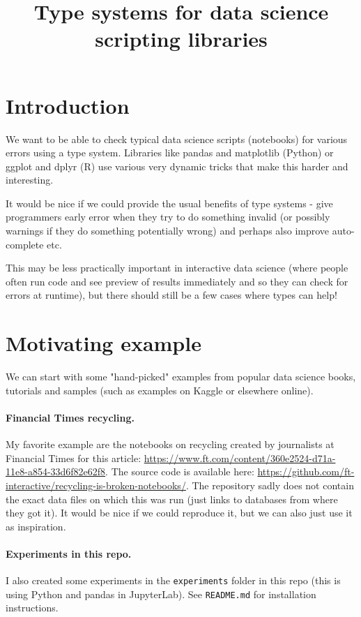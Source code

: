 \documentclass{article}
\begin{document}
\title{Type systems for data science scripting libraries}
\maketitle

\section{Introduction}
We want to be able to check typical data science scripts (notebooks) for various errors using a type system. Libraries like pandas and matplotlib (Python) or ggplot and dplyr (R) use various very dynamic tricks that make this harder and interesting.

It would be nice if we could provide the usual benefits of type systems - give programmers early error when they try to do something invalid (or possibly warnings if they do something potentially wrong) and perhaps also improve auto-complete etc.

This may be less practically important in interactive data science (where people often run code and see preview of results immediately and so they can check for errors at runtime), but there should still be a few cases where types can help!

\section{Motivating example}
We can start with some "hand-picked" examples from popular data science books, tutorials and samples (such as examples on Kaggle or elsewhere online).

\paragraph{Financial Times recycling.}
My favorite example are the notebooks on recycling created by journalists at Financial Times for this article: \url{https://www.ft.com/content/360e2524-d71a-11e8-a854-33d6f82e62f8}.
The source code is available here: \url{https://github.com/ft-interactive/recycling-is-broken-notebooks/}. The repository sadly does not contain the exact data files on which this was run (just links to databases from where they got it). It would be nice if we could reproduce it, but we can also just use it as inspiration.

\paragraph{Experiments in this repo.}
I also created some experiments in the \texttt{experiments} folder in this repo (this is using Python and pandas in JupyterLab). See \texttt{README.md} for installation instructions.
\end{document}
